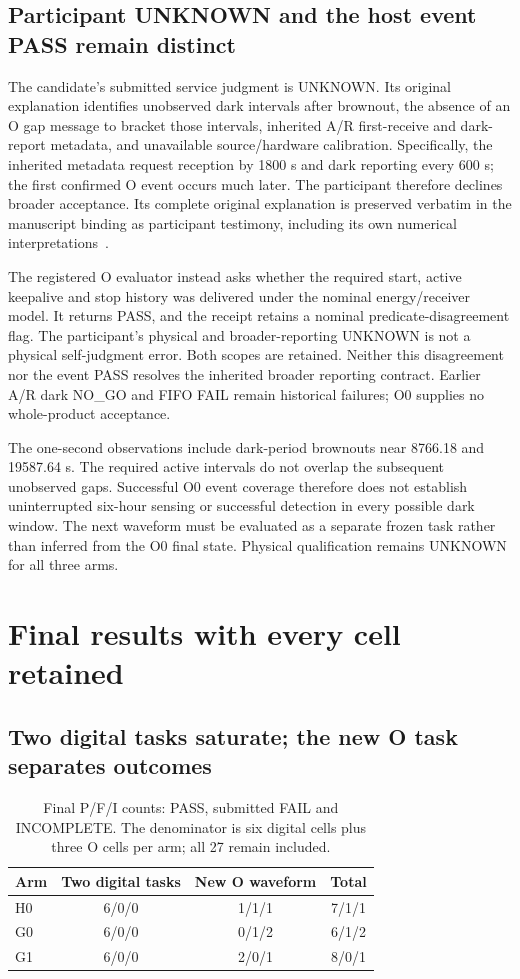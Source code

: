 \subsection{Participant UNKNOWN and the host event PASS remain distinct}
The candidate's submitted service judgment is UNKNOWN. Its original explanation
identifies unobserved dark intervals after brownout, the absence of an O gap
message to bracket those intervals, inherited A/R first-receive and dark-report
metadata, and unavailable source/hardware calibration. Specifically, the
inherited metadata request reception by 1800 s and dark reporting every 600 s;
the first confirmed O event occurs much later. The participant therefore
declines broader acceptance. Its complete original explanation is preserved
verbatim in the manuscript binding as participant testimony, including its
own numerical interpretations~\cite{first,episodes}.

The registered O evaluator instead asks whether the required start, active
keepalive and stop history was delivered under the nominal energy/receiver
model. It returns PASS, and the receipt retains a nominal predicate-disagreement
flag. The participant's physical and broader-reporting UNKNOWN is not a
physical self-judgment error. Both scopes are retained.
Neither this disagreement nor the event PASS resolves the inherited broader
reporting contract. Earlier A/R dark NO\_GO and FIFO FAIL remain historical
failures; O0 supplies no whole-product acceptance.

The one-second observations include dark-period brownouts near 8766.18 and
19587.64 s. The required active intervals do not overlap the subsequent
unobserved gaps. Successful O0 event coverage therefore does not establish
uninterrupted six-hour sensing or successful detection in every possible dark
window. The next waveform must be evaluated as a separate frozen task rather
than inferred from the O0 final state. Physical qualification remains UNKNOWN
for all three arms.

\section{Final results with every cell retained}
\subsection{Two digital tasks saturate; the new O task separates outcomes}
\begin{table}[htbp]
\centering\small
\caption{Final P/F/I counts: PASS, submitted FAIL and INCOMPLETE. The denominator is six digital cells plus three O cells per arm; all 27 remain included.}
\label{tab:final}
\begin{tabular}{@{}lccc@{}}\toprule
Arm & Two digital tasks & New O waveform & Total \\\midrule
H0 & 6/0/0 & 1/1/1 & 7/1/1 \\
G0 & 6/0/0 & 0/1/2 & 6/1/2 \\
G1 & 6/0/0 & 2/0/1 & 8/0/1 \\
\bottomrule\end{tabular}
\end{table}

